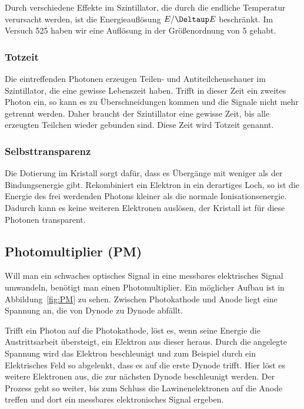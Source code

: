 \documentclass[11pt, ngerman, fleqn, DIV=15, headinclude, BCOR=2cm]{scrreprt}
\begin{document}
Durch verschiedene Effekte im Szintillator, die durch die endliche Temperatur
verursacht werden, ist die Energieauflösung $E/\Deltaup E$ beschränkt. Im
Versuch 525 haben wir eine Auflösung in der Größenordnung von 5 gehabt.

\subsubsection{Totzeit}

Die eintreffenden Photonen erzeugen Teilen- und Antiteilchenschauer im
Szintillator, die eine gewisse Lebenszeit haben. Trifft in dieser Zeit ein
zweites Photon ein, so kann es zu Überschneidungen kommen und die Signale nicht
mehr getrennt werden. Daher braucht der Szintillator eine gewisse Zeit, bis
alle erzeugten Teilchen wieder gebunden sind. Diese Zeit wird Totzeit genannt.

\subsubsection{Selbsttransparenz}

Die Dotierung im Kristall sorgt dafür, dass es Übergänge mit weniger als der
Bindungsenergie gibt. Rekombiniert ein Elektron in ein derartiges Loch, so ist
die Energie des frei werdenden Photons kleiner als die normale
Ionisationsenergie. Dadurch kann es keine weiteren Elektronen auslösen, der
Kristall ist für diese Photonen transparent.

\subsection{Photomultiplier (PM)}

Will man ein schwaches optisches Signal in eine messbares elektrisches Signal
umwandeln, benötigt man einen Photomultiplier. Ein möglicher Aufbau ist in
Abbildung~\ref{fig:PM} zu sehen. Zwischen Photokathode und Anode liegt eine
Spannung an, die von Dynode zu Dynode abfällt.

Trifft ein Photon auf die Photokathode, löst es, wenn seine Energie die
Austrittsarbeit übersteigt, ein Elektron aus dieser heraus. Durch die angelegte
Spannung wird das Elektron beschleunigt und zum Beispiel durch ein Elektrisches
Feld so abgelenkt, dass es auf die erste Dynode trifft. Hier löst es weitere
Elektronen aus, die zur nächsten Dynode beschleunigt werden. Der Prozess geht
so weiter, bis zum Schluss die Lawinenelektronen auf die Anode treffen und dort
ein messbares elektronisches Signal ergeben.
\end{document}
